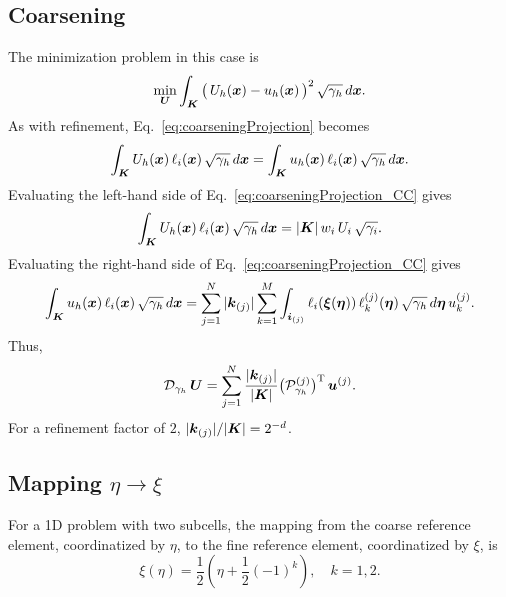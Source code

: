 \documentclass[10pt]{article}
\newcommand{\trans}{\textsc{T}}
\begin{document}
\subsection{Coarsening}

The minimization problem in this case is
\begin{equation}
  \min_{\boldsymbol{U}}\int_{\boldsymbol{K}}\big(\,U_{h}(\boldsymbol{x})-u_{h}(\boldsymbol{x})\,\big)^{2}\,\sqrt{\gamma_{h}}\,d\boldsymbol{x}.
\end{equation}
As with refinement, Eq.~\eqref{eq:coarseningProjection} becomes
\begin{equation}
  \int_{\boldsymbol{K}}U_{h}(\boldsymbol{x})\,\ell_{i}(\boldsymbol{x})\,\sqrt{\gamma_{h}}\,d\boldsymbol{x}
  =\int_{\boldsymbol{K}}u_{h}(\boldsymbol{x})\,\ell_{i}(\boldsymbol{x})\,\sqrt{\gamma_{h}}\,d\boldsymbol{x}.
  \label{eq:coarseningProjection_CC}
\end{equation}
Evaluating the left-hand side of Eq.~\eqref{eq:coarseningProjection_CC} gives
\begin{equation}
  \int_{\boldsymbol{K}}U_{h}(\boldsymbol{x})\,\ell_{i}(\boldsymbol{x})\,\sqrt{\gamma_{h}}\,d\boldsymbol{x}
  =|\boldsymbol{K}|\,w_{i}\,U_{i}\,\sqrt{\gamma_{i}}.
\end{equation}
Evaluating the right-hand side of Eq.~\eqref{eq:coarseningProjection_CC} gives
\begin{equation}
  \int_{\boldsymbol{K}}u_{h}(\boldsymbol{x})\,\ell_{i}(\boldsymbol{x})\,\sqrt{\gamma_{h}}\,d\boldsymbol{x}
  =\sum_{j=1}^{N}|\boldsymbol{k}_{(j)}|\sum_{k=1}^{M}\int_{\boldsymbol{i}_{(j)}}\ell_{i}(\boldsymbol{\xi}(\boldsymbol{\eta}))\,\ell_{k}^{\left(j\right)}(\boldsymbol{\eta})\,\sqrt{\gamma_{h}}\,d\boldsymbol{\eta}\,u_{k}^{(j)}.
\end{equation}
Thus,
\begin{equation}
  \mathcal{D}_{\gamma_{h}}\,\vect{U}=\sum_{j=1}^{N}\f{|\vect{k}_{(j)}|}{|\vect{K}|}
  \big(\mathcal{P}_{\gamma_{h}}^{(j)}\big)^{\trans}\,\vect{u}^{(j)}.
\end{equation}
For a refinement factor of $2$, $|\boldsymbol{k}_{(j)}|/|\boldsymbol{K}|=2^{-d}$.

\subsection{Mapping $\eta\rightarrow\xi$}
For a 1D problem with two subcells, the mapping from the coarse reference element, coordinatized
by $\eta$, to the fine reference element, coordinatized by $\xi$, is
\begin{equation}
\xi\left(\eta\right)=\frac{1}{2}\left(\eta+\frac{1}{2}\left(-1\right)^{k}\right),\hspace{1em}k=1,2.
\end{equation}



\end{document}
